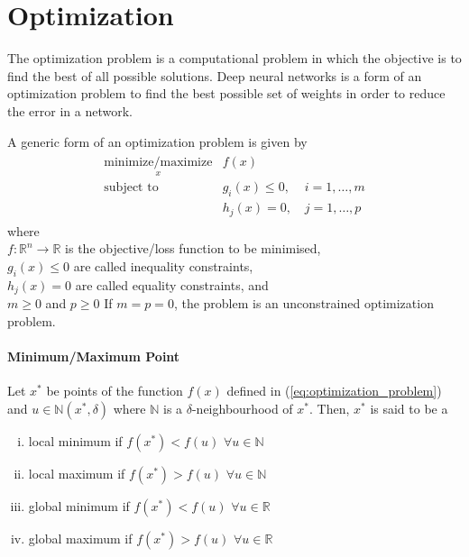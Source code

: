 \chapter{Optimization}
The optimization problem is a computational problem in which the objective is to find the best of all possible solutions. Deep neural networks is a form of an optimization problem to find the best possible set of weights in order to reduce the error in a network.

\noindent A generic form of an optimization problem is given by 
\begin{align}
  \begin{matrix}
    \underset{x}{\text{minimize/maximize}} &f(x) & \\
    \text{subject to} &g_i(x) \leq 0, \, \, & i=1,\dots,m \\
    &h_j(x) = 0, & j=1,\dots,p
  \end{matrix}
  \label{eq:optimization_problem}
\end{align} 
\noindent where \\
\indent $f: \mathbb{R}^n \rightarrow \mathbb{R}$ is the objective/loss function to be minimised,\\
\indent $g_i(x) \leq 0$ are called inequality constraints,\\
\indent $h_j(x) = 0$ are called equality constraints, and \\
\indent $m\geq0$ and $p\geq0$
\noindent If $m=p=0$, the problem is an unconstrained optimization problem.
\subsubsection*{Minimum/Maximum Point}
Let $x^*$  be points of the function $f(x)$ defined in (\ref{eq:optimization_problem}) and $u \in \mathbb{N}(x^*,\delta)$ where $\mathbb{N}$ is a $\delta$-neighbourhood of $x^*$. Then, $x^*$ is said to be a
\begin{enumerate}[(i)]
    \item local minimum if $f(x^*) < f(u)$    $\forall u\in\mathbb{N}$
    \item local  maximum if $f(x^*) > f(u)$ $\forall u\in\mathbb{N}$
    \item global minimum if $f(x^*) < f(u)$ $\forall u\in\mathbb{R}$
    \item global maximum if $f(x^*) > f(u)$ $\forall u\in\mathbb{R}$
\end{enumerate}

